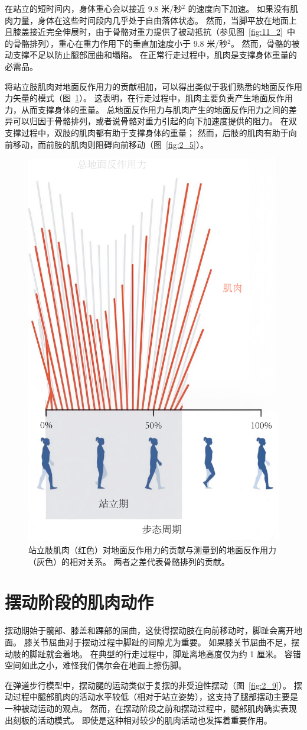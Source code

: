 在站立的短时间内，身体重心会以接近 9.8 米/秒$^2$ 的速度向下加速。
如果没有肌肉力量，身体在这些时间段内几乎处于自由落体状态。
然而，当脚平放在地面上且膝盖接近完全伸展时，由于骨骼对重力提供了被动抵抗（参见图~\ref{fig:11_2}~中的骨骼排列），重心在重力作用下的垂直加速度小于 9.8 米/秒$^2$。
然而，骨骼的被动支撑不足以防止腿部屈曲和塌陷。
在正常行走过程中，肌肉是支撑身体重量的必需品。


将站立肢肌肉对地面反作用力的贡献相加，可以得出类似于我们熟悉的地面反作用力矢量的模式（图~\ref{fig:11_3}）。
这表明，在行走过程中，肌肉主要负责产生地面反作用力，从而支撑身体的重量。
总地面反作用力与肌肉产生的地面反作用力之间的差异可以归因于骨骼排列，或者说骨骼对重力引起的向下加速度提供的阻力。
在双支撑过程中，双肢的肌肉都有助于支撑身体的重量；
然而，后肢的肌肉有助于向前移动，而前肢的肌肉则阻碍向前移动（图~\ref{fig:2_5}）。


\begin{figure}[!htb]
	\centering
	\includegraphics[width=0.4\linewidth]{chap11/11_3}
	\caption{站立肢肌肉（红色）对地面反作用力的贡献与测量到的地面反作用力（灰色）的相对关系。
		两者之差代表骨骼排列的贡献\cite{liu2008muscle}。 \label{fig:11_3}}
\end{figure}


\section{摆动阶段的肌肉动作}

摆动期始于髋部、膝盖和踝部的屈曲，这使得摆动肢在向前移动时，脚趾会离开地面。
膝关节屈曲对于摆动过程中脚趾的间隙尤为重要。
如果膝关节屈曲不足，摆动肢的脚趾就会着地。
在典型的行走过程中，脚趾离地高度仅为约 1 厘米。
容错空间如此之小，难怪我们偶尔会在地面上擦伤脚。


在弹道步行模型中，摆动腿的运动类似于复摆的非受迫性摆动（图~\ref{fig:2_9}）。
摆动过程中腿部肌肉的活动水平较低（相对于站立姿势），这支持了腿部摆动主要是一种被动运动的观点。
然而，在摆动阶段之前和摆动过程中，腿部肌肉确实表现出刻板的活动模式。
即使是这种相对较少的肌肉活动也发挥着重要作用。


